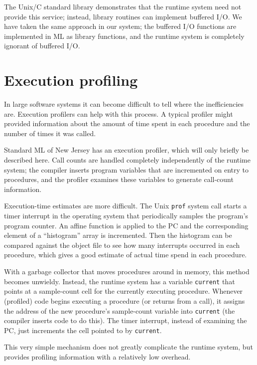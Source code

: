 The Unix/C standard library\cite{kernighan78} demonstrates that
the runtime system need not provide this service; instead, library
routines can implement buffered I/O.  We have taken the same approach
in our system; the buffered I/O functions are implemented in ML as library
functions, and the runtime system is completely ignorant of buffered I/O.


\section{Execution profiling}
\label{execution}

In large software systems it can become difficult to tell where
the inefficiencies are.  Execution profilers can help with this process.
A typical profiler might provided information about the amount of time
spent in each procedure and the number of times it was called.

Standard ML of New Jersey has an execution profiler\cite{appel88:prof},
which will only briefly be described here.  Call counts are handled
completely independently of the runtime system; the compiler inserts
program variables that are incremented on entry to procedures, and the
profiler examines these variables to generate call-count information.

Execution-time estimates are more difficult.  The Unix \verb"prof" system
call starts a timer interrupt in the operating system that periodically
samples the program's program counter.  An affine function is applied
to the PC and the corresponding element of a ``histogram'' array is 
incremented.  Then the histogram can be compared against the object
file to see how many interrupts occurred in each procedure, which gives
a good estimate of actual time spend in each procedure.

With a garbage collector that moves procedures around in memory, this
method becomes unwieldy.  Instead, the runtime system has a variable
\verb"current" that points at a sample-count cell for the currently
executing procedure.  Whenever (profiled) code begins executing a procedure
(or returns from a call), it assigns the address of the new procedure's 
sample-count variable into \verb"current" (the compiler inserts code to do
this).  The timer interrupt, instead
of examining the PC, just increments the cell pointed to by \verb"current".

This very simple mechanism does not greatly complicate the runtime system,
but provides profiling information with a relatively low overhead.

